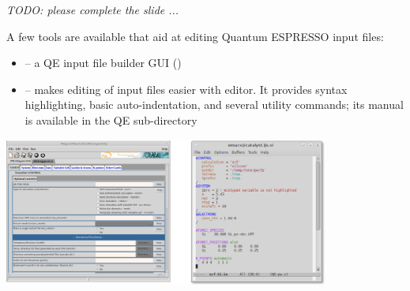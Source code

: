 \documentclass[landscape]{foils}
\def\red{\color{red}}
\begin{document}
\textit{\red TODO: please complete the slide ...}

\rightheader{}
\rightfooter{}
A few tools are available that aid at editing Quantum ESPRESSO input files:
\begin{itemize}
\item {} -- a QE input file builder GUI ()
\item {} -- makes editing of input files easier
  with  editor. It provides syntax highlighting, basic
  auto-indentation, and several utility commands; its manual is
  available in the QE sub-directory
\end{itemize}
\begin{center}
  \includegraphics[width=0.8\textwidth]{figs/pwgui+emacs-modes.png}
\end{center}
\end{document}
